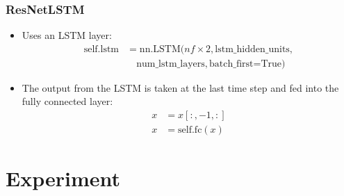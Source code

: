 \documentclass[conference]{IEEEtran}
\begin{document}
\begin{enumerate}
    \subsubsection{ResNetLSTM}
    \begin{itemize}
      \item Uses an LSTM layer: 
        \begin{align*}
          \text{self.lstm} &= \text{nn.LSTM}(nf \times 2, \text{lstm\_hidden\_units}, \\
                                          &\quad \text{num\_lstm\_layers}, \text{batch\_first=True})
        \end{align*}
      \item The output from the LSTM is taken at the last time step and fed into the fully connected layer: 
        \begin{align*}
          x &= x[:, -1, :] \\
          x &= \text{self.fc}(x)
        \end{align*}
    \end{itemize}
    \section{Experiment}

\begin{figure}[htbp]

\end{figure}
\end{enumerate}
\end{document}
